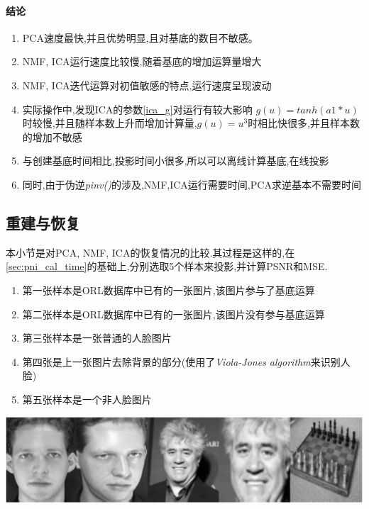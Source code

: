 \paragraph{结论}
\begin{enumerate}
	\item PCA速度最快,并且优势明显,且对基底的数目不敏感。
	\item NMF, ICA运行速度比较慢,随着基底的增加运算量增大
	\item NMF, ICA迭代运算对初值敏感的特点,运行速度呈现波动
	\item 实际操作中,发现ICA的参数\ref{ica_g}对运行有较大影响
		$g(u)=tanh(a1*u)$时较慢,并且随样本数上升而增加计算量,$g(u) = u^3$时相比快很多,并且样本数的增加不敏感
	\item 与创建基底时间相比,投影时间小很多,所以可以离线计算基底,在线投影
	\item 同时,由于伪逆\textit{pinv()}的涉及,NMF,ICA运行需要时间,PCA求逆基本不需要时间
\end{enumerate}



\subsection{重建与恢复}
\label{sec:pni_recon}
本小节是对PCA, NMF, ICA的恢复情况的比较.其过程是这样的,在\ref{sec:pni_cal_time}的基础上,分别选取5个样本来投影,并计算PSNR和MSE. 

\begin{enumerate}
	\item 第一张样本是ORL数据库中已有的一张图片,该图片参与了基底运算
	\item 第二张样本是ORL数据库中已有的一张图片,该图片没有参与基底运算
	\item 第三张样本是一张普通的人脸图片
	\item 第四张是上一张图片去除背景的部分(使用了\textit{Viola-Jones algorithm}来识别人脸)
	\item 第五张样本是一个非人脸图片
\end{enumerate}

	\begin{center}
	\begin{minipage}[t]{\linewidth}
	\center
	{
	\includegraphics[width=\textwidth]{Img/pni_recon} 
	}
	\end{minipage}
	\medskip
	\end{center}

